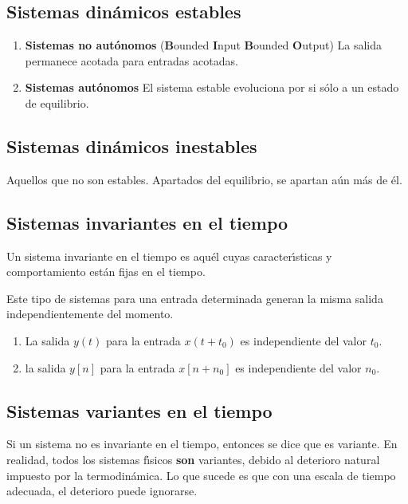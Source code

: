 \subsection{Sistemas din\'{a}micos estables}

\begin{enumerate}
\item \textbf{Sistemas no aut\'{o}nomos} (\textbf{B}ounded
  \textbf{I}nput \textbf{B}ounded \textbf{O}utput) La salida permanece
  acotada para entradas acotadas.

\item \textbf{Sistemas aut\'{o}nomos} El sistema estable evoluciona
  por si s\'{o}lo a un estado de equilibrio.
\end{enumerate}

\subsection{Sistemas din\'{a}micos inestables}

Aquellos que no son estables. Apartados del equilibrio, se apartan
a\'{u}n m\'{a}s de \'{e}l.

\subsection{Sistemas invariantes en el tiempo}

Un sistema invariante en el tiempo es aqu\'{e}l cuyas caracter\'{\i}sticas 
y comportamiento est\'{a}n fijas en el tiempo. 

Este tipo de sistemas para una entrada determinada generan la misma
salida independientemente del momento.
\begin{enumerate}
\item La salida $y(t)$ para la entrada $x(t+t_{0})$ es independiente
  del valor $t_{0}$.
        
\item la salida $y[n]$ para la entrada $x[n + n_{0}]$ es independiente
  del valor $n_{0}$.
\end{enumerate}

\subsection{Sistemas variantes en el tiempo}


Si un sistema no es invariante en el tiempo, entonces se dice que es
variante.  En realidad, todos los sistemas f\'{\i}sicos \textbf{son}
variantes, debido al deterioro natural impuesto por la
termodin\'{a}mica. Lo que sucede es que con una escala de tiempo
adecuada, el deterioro puede ignorarse.

